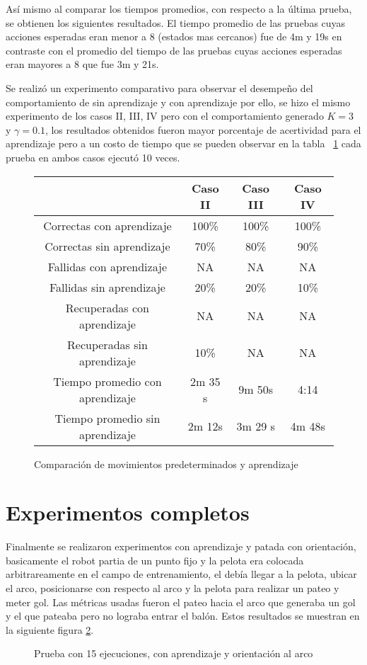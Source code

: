 Así mismo al comparar los tiempos promedios, con respecto a la última prueba, se obtienen los siguientes resultados. El tiempo promedio de las pruebas cuyas acciones esperadas eran menor a 8 (estados mas cercanos) fue de 4m y 19s en contraste con el promedio del tiempo de las pruebas cuyas acciones esperadas eran mayores a 8 que fue 3m y 21s.

Se realiz\'o un experimento comparativo para observar el desempe\~no del comportamiento de sin aprendizaje y con aprendizaje por ello, se hizo el mismo experimento de los casos II, III, IV pero con el comportamiento generado $K = 3 $ y $ \gamma = 0.1$,  los resultados obtenidos fueron mayor porcentaje de acertividad para el aprendizaje pero a un costo de tiempo  que se pueden observar en la tabla ~\ref{tabla:comparacion}  cada prueba en ambos casos ejecut\'o 10 veces.

\begin{figure}
\centering
\begin{tabular}{|c|c|c|c|}
\hline  & Caso II & Caso III & Caso IV \\ 
\hline 
Correctas con aprendizaje & 100\% & 100\% & 100\% \\ 
\hline 
Correctas sin aprendizaje & 70\% & 80\% & 90\% \\ 
\hline 
Fallidas con aprendizaje & NA & NA & NA \\ 
\hline 
Fallidas sin aprendizaje & 20\% & 20\% & 10\% \\ 
\hline 
Recuperadas con aprendizaje & NA & NA & NA \\ 
\hline 
Recuperadas sin aprendizaje & 10\% & NA & NA \\ 
\hline 
Tiempo promedio con aprendizaje & 2m 35 s & 9m 50s & 4:14 \\ 
\hline 
Tiempo promedio sin aprendizaje & 2m 12s & 3m 29 s & 4m 48s \\
\hline
\end{tabular} 
\caption{Comparaci\'on de movimientos predeterminados y aprendizaje}
\label{tabla:comparacion}

\end{figure}

\section{Experimentos completos} \label{completos}

Finalmente se realizaron experimentos con aprendizaje y patada con orientaci\'on, basicamente el robot partia de un punto fijo y la pelota era colocada arbitrareamente en el campo de entrenamiento, el deb\'ia llegar a la pelota, ubicar el arco, posicionarse con respecto al arco y la pelota para realizar un pateo y meter gol.
Las m\'etricas usadas fueron el pateo hacia el arco que generaba un gol y el que pateaba pero no lograba entrar el bal\'on. Estos resultados se muestran en la siguiente figura \ref{fig:orientacion}.


\begin{figure}[h]
\centering
{}
\caption{Prueba con 15 ejecuciones, con aprendizaje y orientaci\'on al arco }
\label{fig:orientacion}
\end{figure} 

